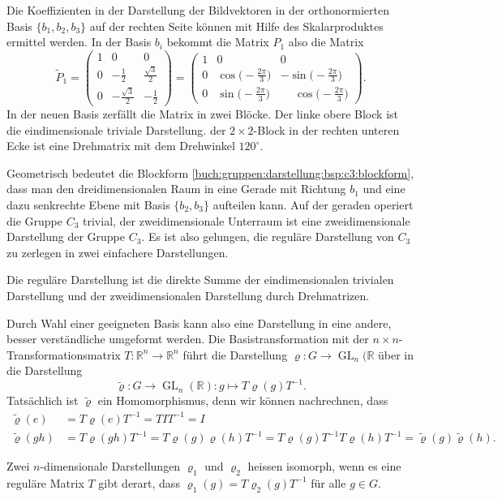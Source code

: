 \begin{beispiel}
Die Koeffizienten in der Darstellung der Bildvektoren in der
orthonormierten Basis $\{b_1,b_2,b_3\}$ auf der rechten Seite
können mit Hilfe des Skalarproduktes ermittel werden.
In der Basis $b_i$ bekommt die Matrix $P_1$ also die Matrix
\begin{equation}
\renewcommand{\arraystretch}{1.2}
\tilde{P}_1
=
\begin{pmatrix}
1&0&0\\
0&-\frac12 & \frac{\!\sqrt{3}}2\\
0&-\frac{\!\sqrt{3}}2&-\frac12
\end{pmatrix}
=
\begin{pmatrix}
1&0&0\\
0&\cos\bigl(-\frac{2\pi}{3}\bigr)& -\sin\bigl(-\frac{2\pi}{3}\bigr) \\
0&\sin\bigl(-\frac{2\pi}{3}\bigr)& \phantom{-}\cos\bigl(-\frac{2\pi}{3}\bigr)
\end{pmatrix}.
\label{buch:gruppen:darstellung:bsp:c3:blockform}
\end{equation}
In der neuen Basis zerfällt die Matrix in zwei Blöcke.
Der linke obere Block ist die eindimensionale triviale Darstellung.
der $2\times 2$-Block in der rechten unteren Ecke ist eine Drehmatrix mit
dem Drehwinkel $120^\circ$.

Geometrisch bedeutet die Blockform
\eqref{buch:gruppen:darstellung:bsp:c3:blockform}, dass man den
dreidimensionalen Raum in eine Gerade mit Richtung $b_1$ und
eine dazu senkrechte Ebene mit Basis $\{b_2,b_3\}$ aufteilen
kann.
Auf der geraden operiert die Gruppe $C_3$ trivial, der zweidimensionale
Unterraum ist eine zweidimensionale Darstellung der Gruppe $C_3$.
Es ist also gelungen, die reguläre Darstellung von $C_3$ zu zerlegen
in zwei einfachere Darstellungen.

Die reguläre Darstellung ist die direkte Summe der eindimensionalen
trivialen Darstellung und der zweidimensionalen Darstellung durch
Drehmatrizen.
\end{beispiel}

Durch Wahl einer geeigneten Basis kann also eine Darstellung
in eine andere, besser verständliche umgeformt werden.
Die Basistransformation mit der $n\times n$-Transformationsmatrix
$T:\mathbb{R}^n\to\mathbb{R}^n$ führt die 
Darstellung $\varrho\colon G\to\operatorname{GL}_n(\mathbb{R}$ über
in die Darstellung
\[
\tilde{\varrho}
\colon
G\to\operatorname{GL}_n(\mathbb{R})
:
g\mapsto T\varrho(g)T^{-1}.
\]
Tatsächlich ist $\tilde{\varrho}$ ein Homomorphismus, denn wir können
nachrechnen, dass
\begin{align*}
\tilde{\varrho}(e)
&=
T\varrho(e)T^{-1}
=
TIT^{-1}
=
I
\\
\tilde{\varrho}(gh)
&=
T\varrho(gh)T^{-1}
=
T\varrho(g)\varrho(h)T^{-1}
=
T\varrho(g)T^{-1}T\varrho(h)T^{-1}
=
\tilde{\varrho}(g)
\tilde{\varrho}(h).
\end{align*}

\begin{definition}
Zwei $n$-dimensionale Darstellungen $\varrho_1$ und $\varrho_2$
heissen isomorph, wenn es eine reguläre Matrix $T$ gibt derart, dass
$\varrho_1(g)=T\varrho_2(g)T^{-1}$ für alle $g\in G$.
\end{definition}

